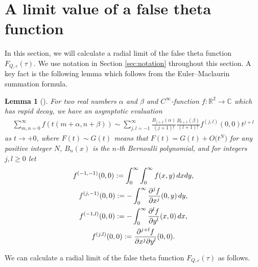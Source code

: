 \documentclass[11pt]{article}
\numberwithin{equation}{section}
\newcommand{\veps}{\varepsilon}
\newcommand{\R}{\mathbb{R}}
\newcommand{\bbC}{\mathbb{C}}
\numberwithin{equation}{section}
\newtheorem{lem}[Theorem]{Lemma}
\begin{document}

\section{A limit value of a false theta function} \label{sec:false_theta_lim}


In this section, we will calculate a radial limit of the false theta function $ F_{Q, \veps} (\tau) $.
We use notation in Section \ref{sec:notation} throughout this section.
A key fact is the following lemma which follows from the Euler--Maclaurin summation formula.

\begin{lem}[{\cite[Lemma 2.2]{BMM}}] \label{lem:Euler-Maclaurin}
	For two real numbers $ \alpha $ and $ \beta $ and $ C^\infty $-function $ f \colon \R^2 \to \bbC $ which has rapid decay, we have an asymptotic evaluation
	\begin{gather*}
	\sum_{m, n = 0}^{\infty} f(t(m+\alpha, n+\beta))
	\sim \sum_{j,l = -1}^{\infty} \frac{B_{j+1}(\alpha)}{(j+1)!} \frac{B_{l+1}(\beta)}{(l+1)!} f^{(j, l)}(0, 0) t^{j+l}
	\end{gather*}
	as $ t \to +0 $, where $ F(t) \sim G(t) $ means that $ F(t) = G(t) + O\big(t^N\big) $ for any positive integer $ N $,
	$ B_n(x) $ is the $ n $-th Bernoulli polynomial, and for integers $ j, l \ge 0 $ let
	\begin{gather*}
		f^{(-1, -1)}(0, 0) := \int_0^\infty \int_0^\infty f(x, y)\, {\rm d}x {\rm d}y, \\
		f^{(j, -1)}(0, 0) := -\int_0^\infty \frac{\partial^j f}{\partial x^j} (0, y)\, {\rm d}y, \\
		f^{(-1, l)}(0, 0) := -\int_0^\infty \frac{\partial^l f}{\partial y^l} (x, 0) \,{\rm d}x, \\
		f^{(j, l)}(0, 0) := \frac{\partial^{j+l} f}{\partial x^j \partial y^l} (0, 0).
	\end{gather*}
\end{lem}

We can calculate a radial limit of the false theta function $ F_{Q, \veps} (\tau) $ as follows.
\end{document}
